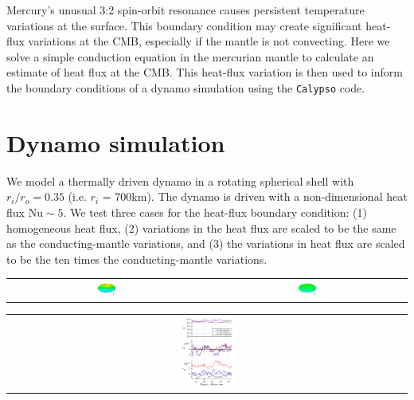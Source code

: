 \documentclass[landscape,a0b,final]{a0poster}
\begin{document}
\begin{multicols}{3}
Mercury's unusual 3:2 spin-orbit resonance causes persistent temperature variations at the surface.  This boundary condition may create significant heat-flux variations at the CMB, especially if the mantle is not convecting.  Here we solve a simple conduction equation in the mercurian mantle to calculate an estimate of heat flux at the CMB.  This heat-flux variation is then used to inform the boundary conditions of a dynamo simulation using the \texttt{Calypso} code.

\columnbreak

\section*{Dynamo simulation}

We model a thermally driven dynamo in a rotating spherical shell with $r_{i}/r_{o} = 0.35$ (i.e.  $r_i$ = 700km).  The dynamo is driven with a non-dimensional heat flux $\mathrm{Nu} \sim 5$.  We test three cases for the heat-flux boundary condition: (1) homogeneous heat flux, (2) variations in the heat flux are scaled to be the same as the conducting-mantle variations, and (3) the variations in heat flux are scaled to be the ten times the conducting-mantle variations.
\begin{center}
\begin{tabular}{cc}
 \includegraphics[width=0.1\textwidth]{br_cmb_x0.png} &
 \includegraphics[width=0.1\textwidth]{br_cmb_x10.png}
\end{tabular}
\label{dynamo}
\end{center}

\begin{center}
\begin{tabular}{c}
 \includegraphics[width=0.15\textwidth]{gauss_coefficients.pdf} 
\end{tabular}
\label{gauss}
\end{center}



\end{multicols}
\end{document}
